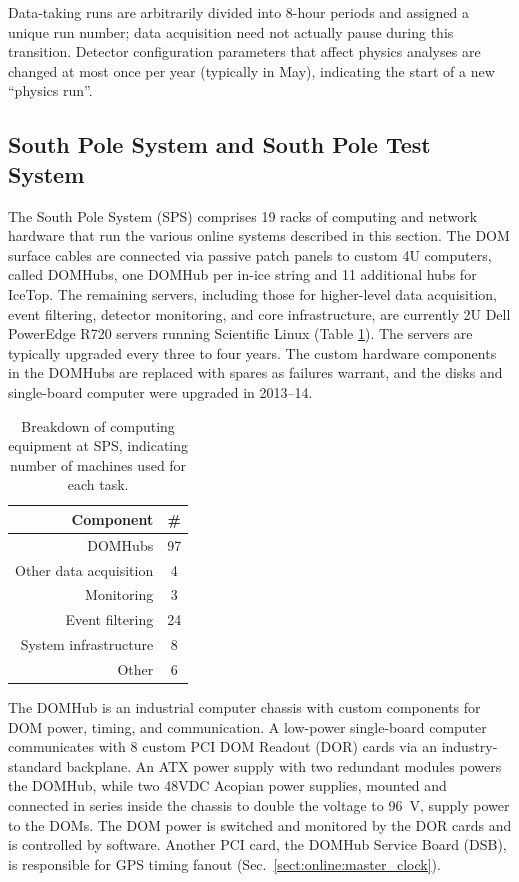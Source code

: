 Data-taking runs are arbitrarily divided into 8-hour periods and assigned
a unique run number; data acquisition need not actually pause during
this transition.  Detector configuration parameters that affect physics
analyses are changed at most once per year (typically in May), indicating
the start of a new ``physics run''.   

\subsection{\label{sect:sps}South Pole System and South Pole Test System}

The South Pole System (SPS) comprises 19 racks of computing and network
hardware that run the various online systems described in this
section.  The DOM surface cables are connected via passive patch panels to
custom 4U computers, called DOMHubs, one DOMHub per in-ice string and 11 additional
hubs for IceTop.  The remaining servers, including those for higher-level
data acquisition, event filtering, detector monitoring, and core
infrastructure, are currently 2U Dell PowerEdge R720 servers running
Scientific Linux (Table \ref{tab:sps_breakdown}).  The servers are
typically upgraded every three to four years.  The custom hardware components in
the DOMHubs are replaced with spares as failures warrant, and the disks and
single-board computer were upgraded in 2013--14.

\begin{table}[h]
  \centering
\caption{Breakdown of computing equipment at SPS, indicating number of
    machines used for each task.}
  \begin{tabular}{ r  c }
\hline
    Component & \# \\ \hline DOMHubs & 97 \\ Other data
    acquisition & 4 \\
    Monitoring & 3 \\ Event filtering & 24 \\ System infrastructure & 8 \\ Other &
    6 \\
\hline
  \end{tabular}
  \label{tab:sps_breakdown}
\end{table}

The DOMHub is an industrial computer chassis with custom components for DOM
power, timing, and communication.  A low-power single-board computer
communicates with 8 custom PCI DOM Readout (DOR) cards via an
industry-standard backplane.  An ATX power supply with two
redundant modules powers the DOMHub, while two
48VDC Acopian power supplies, mounted and connected in series inside the
chassis to double the voltage to 96~V, supply power to the DOMs.  The DOM power is switched and
monitored by the DOR cards and is controlled by software.  Another PCI
card, the DOMHub Service Board (DSB), is responsible for GPS timing fanout
(Sec.~\ref{sect:online:master_clock}).

